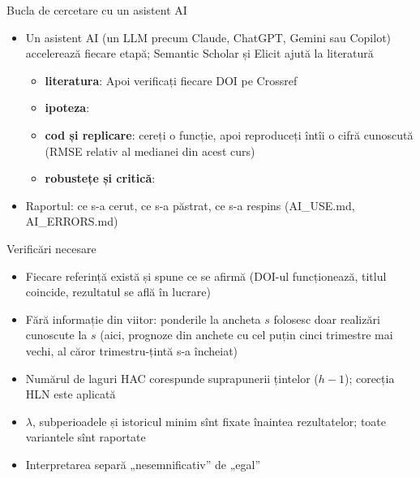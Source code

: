 \begin{frame}{Bucla de cercetare cu un asistent AI}
\itemsize{\footnotesize}
\begin{itemize}
    \item Un asistent AI (un LLM precum Claude, ChatGPT, Gemini sau Copilot) accelerează fiecare etapă; Semantic Scholar și Elicit ajută la literatură
    \begin{itemize}
        \item \textbf{literatura}:  Apoi verificați fiecare DOI pe Crossref
        \item \textbf{ipoteza}: 
        \item \textbf{cod și replicare}: cereți o funcție, apoi reproduceți întîi o cifră cunoscută (RMSE relativ al medianei din acest curs)
        \item \textbf{robustețe și critică}: 
    \end{itemize}
    \item Raportul: ce s-a cerut, ce s-a păstrat, ce s-a respins (AI\_USE.md, AI\_ERRORS.md)
\end{itemize}
\end{frame}

\begin{frame}{Verificări necesare}
\itemsize{\small}
\begin{itemize}
    \item Fiecare referință există și spune ce se afirmă (DOI-ul funcționează, titlul coincide, rezultatul se află în lucrare)
    \item Fără informație din viitor: ponderile la ancheta $s$ folosesc doar realizări cunoscute la $s$ (aici, prognoze din anchete cu cel puțin cinci trimestre mai vechi, al căror trimestru-țintă s-a încheiat)
    \item Numărul de laguri HAC corespunde suprapunerii țintelor ($h - 1$); corecția HLN este aplicată
    \item $\lambda$, subperioadele și istoricul minim sînt fixate înaintea rezultatelor; toate variantele sînt raportate
    \item Interpretarea separă „nesemnificativ” de „egal”
\end{itemize}
\end{frame}

